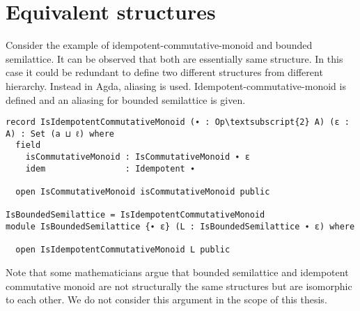 \section{Equivalent structures}
Consider the example of idempotent-commutative-monoid and bounded semilattice. It can be observed that both are essentially same structure. In this case it could be redundant to define two different structures from different hierarchy. Instead in Agda, aliasing is used. Idempotent-commutative-monoid is defined and an aliasing for bounded semilattice is given.
\begin{Verbatim}[commandchars=\\\{\}]
record IsIdempotentCommutativeMonoid (∙ : Op\textsubscript{2} A) (ε : A) : Set (a ⊔ ℓ) where
  field
    isCommutativeMonoid : IsCommutativeMonoid ∙ ε
    idem                : Idempotent ∙

  open IsCommutativeMonoid isCommutativeMonoid public

IsBoundedSemilattice = IsIdempotentCommutativeMonoid
module IsBoundedSemilattice {∙ ε} (L : IsBoundedSemilattice ∙ ε) where

  open IsIdempotentCommutativeMonoid L public
\end{Verbatim}

Note that some mathematicians argue that bounded semilattice and idempotent commutative monoid are not structurally the same structures but are isomorphic to each other. We do not consider this argument in the scope of this thesis.